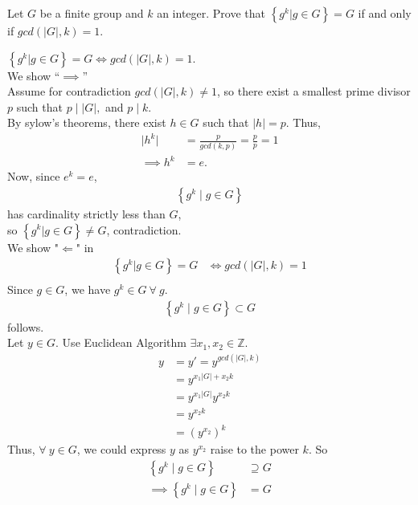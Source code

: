 \documentclass{article}
\begin{document}
\begin{homeworkProblem}
     Let $G$ be a finite group and 
     $k$ an integer. 
     Prove that $\left\{ g^k | g \in G \right\} = G$
     if and only if $gcd \left( \lvert G \rvert, k \right) = 1$.\\
 
     \solution
 
     $\left\{ g^k | g \in G \right\} = G \iff gcd( \lvert G \rvert, k ) = 1$.\\
     We show ``$\implies$''\\
     Assume for contradiction $gcd ( \lvert G \rvert, k) \neq 1$,
     so there exist a smallest prime divisor $p$ 
     such that $p \mid \lvert G \rvert,$ and $p \mid k$.\\
     By sylow's theorems, there exist $h \in G$ such that
     $\lvert h \rvert = p$. Thus,\\
     \begin{align}
         \lvert h^k \rvert &= \frac{ p }{ gcd(k,p) } = \frac{ p }{ p } = 1\\
         \implies h^k &= e.
     \end{align}
     Now, since $e^k = e$,
     \begin{align}
         \left\{ g^k \mid g \in G \right\}
     \end{align}
     has cardinality strictly less than $G$,\\
     so $\left\{ g^k | g \in G \right\} \neq G$, contradiction.\\

     We show "$\Leftarrow$" in 
     \begin{align}
         \left\{ g^k | g \in G \right\} = G &\iff gcd( \lvert G \rvert, k) = 1\\
     \end{align}
     Since $g \in G$, we have $g^k \in G \ \forall \ g$.
     \begin{align}
        \left\{ g^k \mid g \in G  \right\} \subset G
     \end{align}
     follows.\\
     Let $y \in G$. Use Euclidean Algorithm 
     $\exists x_1, x_2 \in \mathbb{Z}$.
     \begin{align}
         y &= y' = y^{gcd (\lvert G \rvert, k)} \\
         &= y^{x_1 \lvert G \rvert + x_2 k}\\
         &=y^{x_1 \lvert G \rvert} y^{x_2 k}\\
         &= y^{x_2 k}\\
         &=(y^{x_2})^k
     \end{align}
     Thus, $\forall \ y \in G$,
     we could express $y$ as $y^{x_2}$
     raise to the power $k$. So
     \begin{align}
         \left\{ g^k \mid g \in G \right\} &\supseteq G\\
         \implies \left\{ g^k \mid g \in G \right\} &= G
     \end{align}
     

     
     
     
     
    


    
\end{homeworkProblem}

\pagebreak
\end{document}
